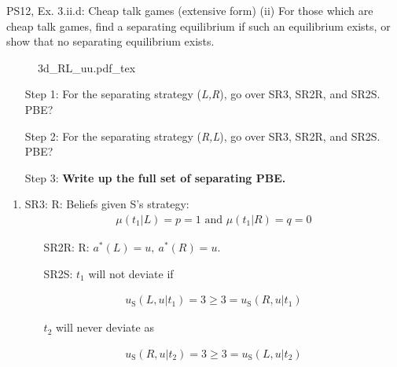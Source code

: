 \begin{frame}{PS12, Ex. 3.ii.d: Cheap talk games (extensive form)}
    (ii) For those which are cheap talk games, find a separating equilibrium if such an equilibrium exists, or show that no separating equilibrium exists.\vspace{-6pt}
    \begin{multicols}{2}
      \begin{figure}[!h]
        \center{}
        {3d_RL_uu.pdf_tex}
      \end{figure}\vspace{-6pt}
      \begin{itemize}
        \item[Step 1:] For the separating strategy (\textit{L,R}), go over SR3, SR2R, and SR2S. PBE?
        \item[Step 2:] For the separating strategy (\textit{R,L}), go over SR3, SR2R, and SR2S. PBE?
        \item[Step 3:] \textbf{Write up the full set of separating PBE.}
      \end{itemize}
      \vfill\null\columnbreak
      \begin{enumerate}
        \item SR3: R: Beliefs given S's strategy:\vspace{-8pt}
        \begin{align*}
          \mu(t_1|L)=p=1\text{ and }\mu(t_1|R)=q=0
        \end{align*}\vspace{-18pt}
        \begin{itemize}\normalsize
          \item[SR2R:] R: $a^*(L)=u,\ a^*(R)=u$.
          \item[SR2S:] $t_1$ will not deviate if
        \end{itemize}\vspace{-10pt}
        \begin{align*}
          u_\text{S}(L,u|t_1)=3\geq 3=u_\text{S}(R,u|t_1)
        \end{align*}\vspace{-18pt}
        \begin{itemize}\normalsize
          \item[] $t_2$ will never deviate as
        \end{itemize}\vspace{-10pt}
        \begin{align*}
          u_\text{S}(R,u|t_2)=3\geq3=u_\text{S}(L,u|t_2)

\end{align*}
\end{enumerate}
\end{multicols}
\end{frame}
